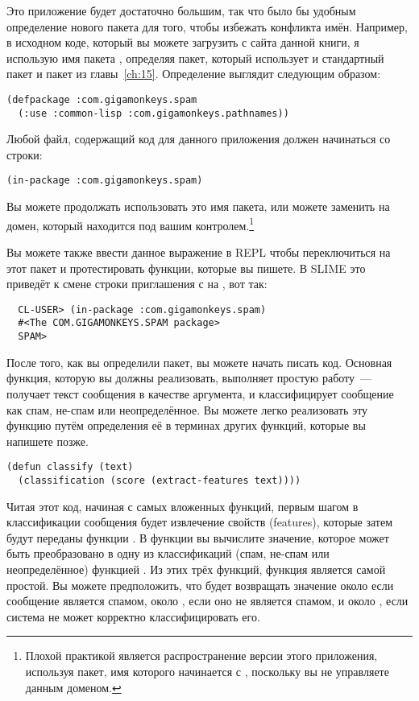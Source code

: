 Это приложение будет достаточно большим, так что было бы удобным определение нового пакета
для того, чтобы избежать конфликта имён.  Например, в исходном коде, который вы можете
загрузить с сайта данной книги, я использую имя пакета ,
определяя пакет, который использует и стандартный пакет  и пакет
 из главы~\ref{ch:15}.  Определение выглядит следующим
образом:

\begin{lstlisting}
(defpackage :com.gigamonkeys.spam
  (:use :common-lisp :com.gigamonkeys.pathnames))
\end{lstlisting}

Любой файл, содержащий код для данного приложения должен начинаться со строки:

\begin{lstlisting}
(in-package :com.gigamonkeys.spam)
\end{lstlisting}

Вы можете продолжать использовать это имя пакета, или можете заменить
 на домен, который находится под вашим контролем.\footnote{Плохой
  практикой является распространение версии этого приложения, используя пакет, имя
  которого начинается с , поскольку вы не управляете данным
  доменом.}

Вы можете также ввести данное выражение в REPL чтобы переключиться на этот пакет и
протестировать функции, которые вы пишете.  В SLIME это приведёт к смене строки
приглашения с  на , вот так:

\begin{verbatim}
  CL-USER> (in-package :com.gigamonkeys.spam)
  #<The COM.GIGAMONKEYS.SPAM package>
  SPAM> 
\end{verbatim}

После того, как вы определили пакет, вы можете начать писать код.  Основная функция,
которую вы должны реализовать, выполняет простую работу~--- получает текст сообщения в
качестве аргумента, и классифицирует сообщение как спам, не-спам или неопределённое.  Вы
можете легко реализовать эту функцию путём определения её в терминах других функций,
которые вы напишете позже.

\begin{lstlisting}
(defun classify (text)
  (classification (score (extract-features text))))
\end{lstlisting}

Читая этот код, начиная с самых вложенных функций, первым шагом в классификации сообщения
будет извлечение свойств (features), которые затем будут переданы функции .  В
функции  вы вычислите значение, которое может быть преобразовано в одну из
классификаций (спам, не-спам или неопределённое) функцией .  Из этих
трёх функций, функция  является самой простой. Вы можете
предположить, что  будет возвращать значение около  если сообщение
является спамом, около , если оно не является спамом, и около , если
система не может корректно классифицировать его.

